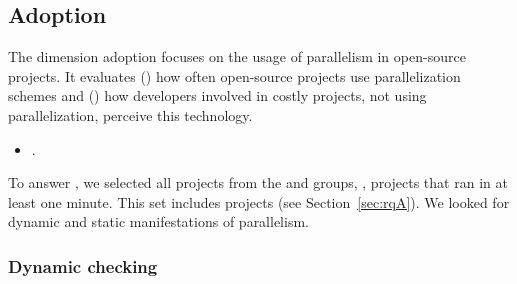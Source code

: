 



\subsection{Adoption}
\label{sec:rqC}
\label{sec:rqE}

The dimension adoption focuses on the usage of parallelism in
open-source projects.  It evaluates (\numRQAdoptionOne) how often open-source
projects use parallelization schemes and (\numRQAdoptionTwo) how developers
involved in costly projects, not using parallelization, perceive this
technology.

\begin{itemize}
    \item \numRQAdoptionOne. \textbf{\RQAdoptionOne{}}
\end{itemize}

To answer \numRQAdoptionOne{}, we selected all projects from the \medg{} and
\longg{} groups, \ie, projects that ran in at least one minute.  This
set includes \numMedLong{} projects (see Section~\ref{sec:rqA}).  We
looked for dynamic and static manifestations of parallelism.


\vspace{1ex}
\subsubsection{Dynamic checking}
\label{sec:rqC-1}

